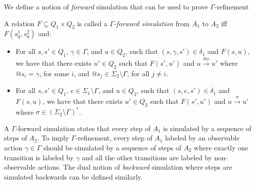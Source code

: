 We define a notion of \emph{forward} simulation that can be used to prove $\Gamma$-refinement %

\vspace{-1.5mm}
\begin{definition}
A relation $F \subseteq Q_{1} \times Q_{2}$ is called a \emph{$\Gamma$-forward simulation} from $A_1$ to $A_2$ if{f} $F(s_0^1,s_0^2)$ and:
\vspace{-1.5mm}
\begin{itemize}
\item For all $s,s'\in Q_1$, $\gamma\in \Gamma$, and $u\in Q_2$, such that $(s,\gamma,s') \in \delta_1$ and $F(s,u)$, we have that there exists $u'\in Q_2$ such that $F(s',u')$ and $u \xrightarrow{@s} u'$ where $@s_i=\gamma$, for some $i$, and $@s_j\in \Sigma_2\setminus\Gamma$, for all $j\neq i$.
\item For all $s,s'\in Q_1$, $e \in \Sigma_1\setminus \Gamma$, and $u\in Q_2$, such that $(s,e,s') \in \delta_1$ and $F(s,u)$, we have that there exists $u'\in Q_2$ such that $F(s',u')$ and $u \xrightarrow{\sigma} u'$ where $\sigma\in (\Sigma_2\setminus\Gamma)^*$.  
\end{itemize}
\vspace{-2.5mm}
\end{definition}
A $\Gamma$-forward simulation states that every step of $A_1$ is simulated by a sequence of steps of $A_2$. To imply $\Gamma$-refinement, every step of $A_1$ labeled by an observable action $\gamma\in \Gamma$ should be simulated by a sequence of steps of $A_2$ where exactly one transition is labeled by $\gamma$ and all the other transitions are labeled by non-observable actions.
The dual notion of \emph{backward} simulation where steps are simulated backwards can be defined similarly.




